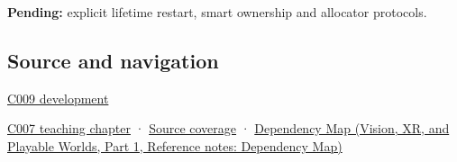\textbf{Pending:} explicit lifetime restart, smart ownership and allocator protocols.

\subsection{Source and navigation}\label{appendix-a82f9c438857-source-and-navigation}

\hypertarget{appendix-a82f9c438857-source-and-navigation}{}

\hyperref[appendix-fd090d982a15-m009---parts-127-147]{C009 development}

\hyperref[01-foundations-i-ch002-storage-is-a-place-an-object-is-its-occupant]{C007 teaching chapter} · \hyperref[appendix-fd090d982a15-m007---parts-101-112]{Source coverage} · \href{../07-Vision-XR-and-Playable-Worlds-P01/main.pdf\#appendix-4ad47bdd269a}{Dependency Map (Vision, XR, and Playable Worlds, Part 1, Reference notes: Dependency Map)}
